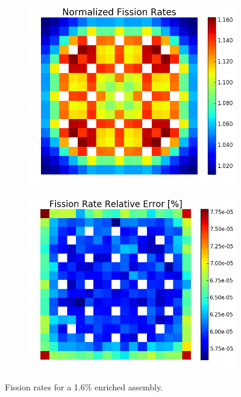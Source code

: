 \begin{figure}[h!]
\centering
\begin{subfigure}{0.5\textwidth}
  \centering
  \includegraphics[width=\linewidth]{figures/benchmarks/fission-rates/fiss-mean-fuel-16}
  \caption{}
  \label{fig:chap7-fiss-rate-mean-1.6-assm}
\end{subfigure}%
\begin{subfigure}{0.5\textwidth}
  \centering
  \includegraphics[width=\linewidth]{figures/benchmarks/fission-rates/fiss-rel-err-fuel-16}
  \caption{}
  \label{fig:chap7-fiss-rate-rel-err-1.6-assm}
\end{subfigure}%
\caption[Fission rates for a 1.6\% enriched assembly]{Fission rates for a 1.6\% enriched assembly.}
\label{fig:chap7-fiss-rates-1.6-assm}
\end{figure}


